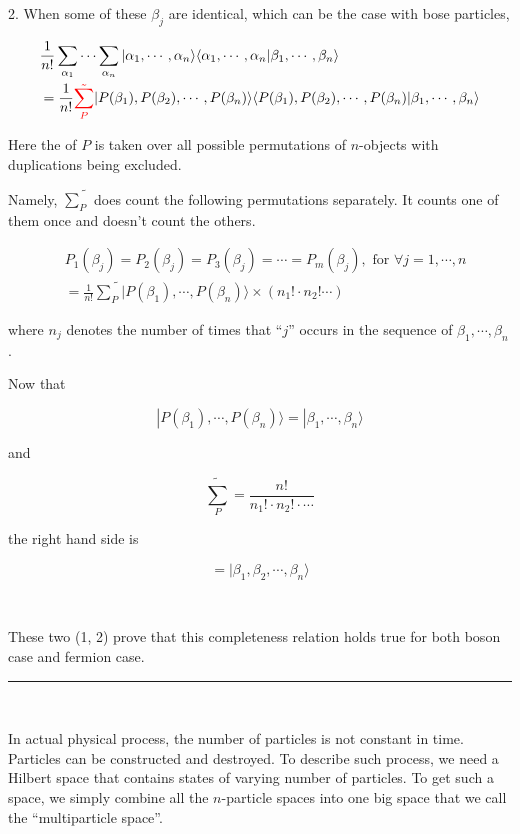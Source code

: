 ﻿\documentclass[twoside]{book}
\numberwithin{equation}{section}
\begin{document}
{\Huge 2. }When some of these $\beta_j$ are identical, which can be the case with bose particles, 

\[\begin{split}
&\frac{1}{n!}\sum_{\alpha_1}\cdots\sum_{\alpha_n}|\alpha_1,\cdots,\alpha_n\rangle\langle\alpha_1,\cdots,\alpha_n|\beta_1,\cdots,\beta_n\rangle \\
&= \frac{1}{n!}{\color{red}{\tilde{\sum_P}}}|P(\beta_1),P(\beta_2),\cdots,P(\beta_n)\rangle\langle P(\beta_1),P(\beta_2),\cdots,P(\beta_n)|\beta_1,\cdots,\beta_n\rangle \end{split}\]

Here the {\color{red}{summation}} of $P$ is taken over all possible permutations of $n$-objects with duplications being excluded. 

Namely, $\tilde{\sum_P}$ does count the following permutations separately. It counts one of them once and doesn't count the others. 

\[
\begin{split}
&P_1(\beta_j) = P_2(\beta_j) = P_3(\beta_j)=\cdots=P_m(\beta_j), \text{ for }\forall j = 1,\cdots,n\\ 
&=\frac{1}{n!}\tilde{\sum_P}|P(\beta_1),\cdots,P(\beta_n)\rangle\times(n_1!\cdot n_2!\cdots)
\end{split}\]

where $n_j$ denotes the number of times that ``$j$'' occurs in the sequence of $\beta_1,\cdots,\beta_n$. 

Now that 

\[|P(\beta_1),\cdots,P(\beta_n)\rangle = |\beta_1,\cdots,\beta_n\rangle \]

and

\[\tilde{\sum_P} = \frac{n!}{n_1!\cdot n_2!\cdot\cdots} \]

the right hand side is

\[=|\beta_1,\beta_2,\cdots,\beta_n\rangle \]

\ 

These two ({\Huge 1, 2}) prove that this completeness relation holds true for both boson case and fermion case. \\

\hrule

\ 

In actual physical process, the number of particles is not constant in time. Particles can be constructed and destroyed. To describe such process, we need a Hilbert space that contains states of varying number of particles. To get such a space, we simply combine all the $n$-particle spaces into one big space that we call the ``multiparticle space''. 
\end{document}
